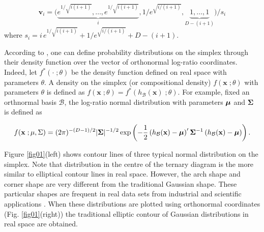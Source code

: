 \documentclass[10pt, a4paper]{article}
\begin{document}
\[
\textbf{v}_i = \Big( \underbrace{e^{1/\sqrt{i(i+1)}}, \dots, e^{1/\sqrt{i(i+1)}}}_{i}, 1/e^{\sqrt{ i/(i+1)}}, \underbrace{1, \dots, 1}_{D-(i+1)} \Big) / s_i
\]
where $s_i =  i\,e^{1/\sqrt{i(i+1)}} + 1/e^{\sqrt{ i/(i+1)}} + D - (i+1)$.


According to \cite{mateu2013normal}, one can define probability distributions on the simplex through their density function over the vector of orthonormal log-ratio coordinates. Indeed, let $f^*(\cdot \;; \theta)$ be the density function defined on real space with parameters $\theta$. A density on the simplex (or compositional density) $f(\mathbf{x}\;; \theta)$ with parameters $\theta$ is defined as $f(\mathbf{x}\;; \theta)=f^*(h_\mathcal{B}(\textbf{x})\;; \theta)$. For example, fixed an orthnormal basis $\mathcal{B}$, the log-ratio normal distribution with parameters $\mbox{\boldmath \(\mu\)}$ and $\mathbf{\Sigma}$ is defined as

\begin{equation}\label{eq:densSNormal}
f(\mathbf{x}\;; \mu, \Sigma) =(2\pi)^{-(D-1)/2} |\mathbf{\Sigma}|^{-1/2} \exp \left( -{\frac{1}{2}} \left(h_\mathcal{B}(\textbf{x})- \mbox{\boldmath \(\mu\)} \right)' \mathbf{\Sigma}^{-1} \left( h_\mathcal{B}(\textbf{x})- \mbox{\boldmath\(\mu\)} \right)\right).
\end{equation}

Figure \ref{fig01}(left) shows  contour lines of three typical normal distribution on the simplex. Note that distribution in the centre of the ternary diagram is the more similar to elliptical contour lines in real space. However, the arch shape and corner shape are very different from the traditional Gaussian shape. These particular shapes are frequent in real data sets from industrial and scientific applications \citep{aitchison1986statistical, Buccianti11}.
When these distributions are plotted using orthonormal coordinates (Fig. \ref{fig01}(right)) the traditional elliptic contour of
Gaussian distributions in real space are obtained.
\end{document}
